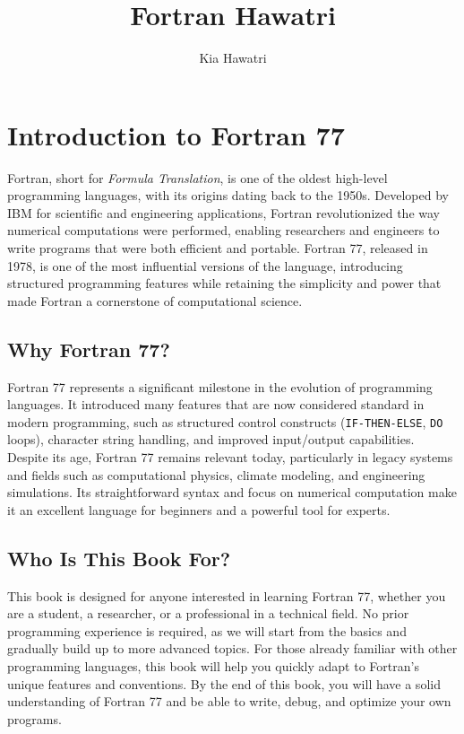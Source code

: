 \documentclass{book}
\title{Fortran Hawatri}
\author{Kia Hawatri}
\begin{document}
\maketitle
\chapter*{Introduction to Fortran 77}

Fortran, short for \textit{Formula Translation}, is one of the oldest high-level programming languages, with its origins dating back to the 1950s. Developed by IBM for scientific and engineering applications, Fortran revolutionized the way numerical computations were performed, enabling researchers and engineers to write programs that were both efficient and portable. Fortran 77, released in 1978, is one of the most influential versions of the language, introducing structured programming features while retaining the simplicity and power that made Fortran a cornerstone of computational science.

\section*{Why Fortran 77?}
Fortran 77 represents a significant milestone in the evolution of programming languages. It introduced many features that are now considered standard in modern programming, such as structured control constructs (\texttt{IF-THEN-ELSE}, \texttt{DO} loops), character string handling, and improved input/output capabilities. Despite its age, Fortran 77 remains relevant today, particularly in legacy systems and fields such as computational physics, climate modeling, and engineering simulations. Its straightforward syntax and focus on numerical computation make it an excellent language for beginners and a powerful tool for experts.

\section*{Who Is This Book For?}
This book is designed for anyone interested in learning Fortran 77, whether you are a student, a researcher, or a professional in a technical field. No prior programming experience is required, as we will start from the basics and gradually build up to more advanced topics. For those already familiar with other programming languages, this book will help you quickly adapt to Fortran's unique features and conventions. By the end of this book, you will have a solid understanding of Fortran 77 and be able to write, debug, and optimize your own programs.
\end{document}
